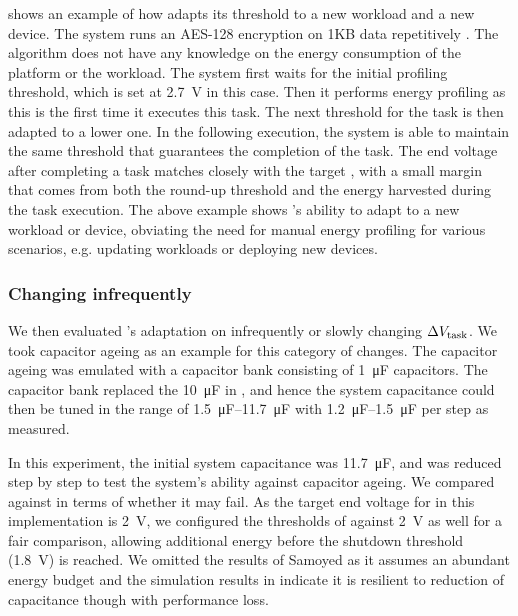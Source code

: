  shows an example of how \nn{} adapts its threshold to a new workload and a new device. 
The system runs an AES-128 encryption on 1KB data repetitively . 
The algorithm does not have any knowledge on the energy consumption of the platform or the workload.
The system first waits for the initial profiling threshold, which is set at \SI{2.7}{\volt} in this case. 
Then it performs energy profiling as this is the first time it executes this task. 
The next threshold for the task is then adapted to a lower one.
In the following execution, the system is able to maintain the same threshold that guarantees the completion of the task. 
The end voltage after completing a task matches closely with the target , with a small margin that comes from both the round-up threshold and the energy harvested during the task execution. 
The above example shows \nn{}'s ability to adapt to a new workload or device, obviating the need for manual energy profiling for various scenarios, e.g. updating workloads or deploying new devices. 

\subsubsection{Changing infrequently}




We then evaluated \nn{}'s adaptation on infrequently or slowly changing $\Delta V_{\text{task}}$.
We took capacitor ageing as an example for this category of changes. 
The capacitor ageing was emulated with a capacitor bank consisting of \SI{1}{\micro\farad} capacitors. 
The capacitor bank replaced the \SI{10}{\micro\farad}  in , and hence the system capacitance could then be tuned in the range of \SIrange{1.5}{11.7}{\micro\farad} with \SIrange{1.2}{1.5}{\micro\farad} per step as measured. 

In this experiment, the initial system capacitance was \SI{11.7}{\micro\farad}, and was reduced step by step to test the system's ability against capacitor ageing. 
We compared \nn{} against \debs{} in terms of whether it may fail. 
As the target end voltage for \nn{} in this implementation is \SI{2}{\volt}, we configured the thresholds of \debs{} against \SI{2}{\volt} as well for a fair comparison, allowing additional energy before the shutdown threshold (\SI{1.8}{\volt}) is reached.
We omitted the results of Samoyed as it assumes an abundant energy budget and the simulation results in  indicate it is resilient to reduction of capacitance though with performance loss. 

